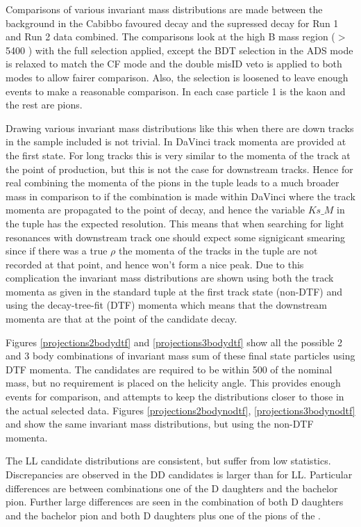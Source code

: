 Comparisons of various invariant mass distributions are made between the background in the Cabibbo favoured decay and the supressed decay for Run 1 and Run 2 data combined. The comparisons look at the high B mass region ($>$ 5400 \mev) with the full selection applied, except the BDT selection in the ADS mode is relaxed to match the CF mode and the double misID veto is applied to both modes to allow fairer comparison. Also, the \Kstar selection is loosened to leave enough events to make a reasonable comparison. In each case particle 1 is the kaon and the rest are pions. 

Drawing various invariant mass distributions like this when there are down tracks in the sample included is not trivial. In DaVinci track momenta are provided at the first state. For long tracks this is very similar to the momenta of the track at the point of production, but this is not the case for downstream tracks. Hence for real \KS combining the momenta of the pions in the tuple leads to a much broader \KS mass in comparison to if the combination is made within DaVinci where the track momenta are propagated to the point of decay, and hence the variable $Ks\_M$ in the tuple has the expected resolution. This means that when searching for light resonances with downstream track one should expect some signigicant smearing since if there was a true $\rho$ the momenta of the tracks in the tuple are not recorded at that point, and hence won't form a nice peak. Due to this complication the invariant mass distributions are shown using both the track momenta as given in the standard tuple at the first track state (non-DTF) and using the decay-tree-fit (DTF) momenta which means that the downstream momenta are that at the point of the \KS candidate decay. 

Figures \ref{projections2bodydtf} and \ref{projections3bodydtf} show all the possible 2 and 3 body combinations of invariant mass sum of these final state particles using DTF momenta. The \Kstar candidates are required to be within 500 \mev of the nominal mass, but no requirement is placed on the \KS helicity angle. This provides enough events for comparison, and attempts to keep the distributions closer to those in the actual selected data. Figures \ref{projections2bodynodtf}, \ref{projections3bodynodtf} and show the same invariant mass distributions, but using the non-DTF momenta.

The LL candidate distributions are consistent, but suffer from low statistics. Discrepancies are observed in the DD candidates is larger than for LL. Particular differences are between combinations one of the D daughters and the bachelor pion. Further large differences are seen in the combination of both D daughters and the bachelor pion and both D daughters plus one of the pions of the \KS. 

